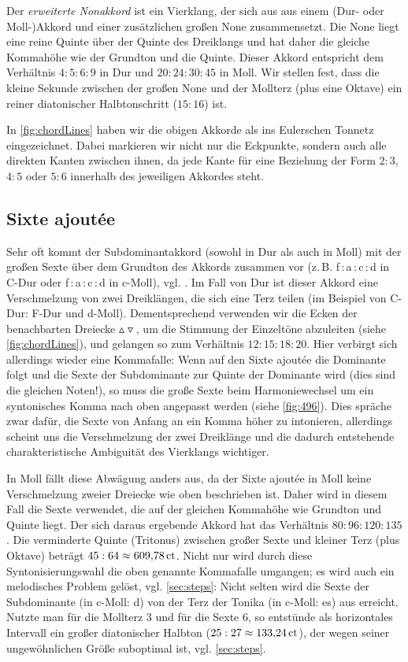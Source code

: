 Der \emph{erweiterte Nonakkord} ist ein Vierklang, der sich aus aus einem (Dur-
oder Moll-)Akkord und einer zusätzlichen großen None zusammensetzt.  Die None
liegt eine reine Quinte über der Quinte des Dreiklangs und hat daher die gleiche
Kommahöhe wie der Grundton und die Quinte. Dieser
Akkord entspricht dem Verhältnis $4:5:6:9$ in Dur und $20:24:30:45$ in Moll. Wir
stellen fest, dass die kleine Sekunde zwischen der großen None und der Mollterz
(plus eine Oktave) ein reiner diatonischer Halbtonschritt ($15:16$) ist.

In \cref{fig:chordLines} haben wir die obigen Akkorde als ins Eulerschen Tonnetz
eingezeichnet. Dabei markieren wir nicht nur die Eckpunkte, sondern auch alle
direkten Kanten zwischen ihnen, da jede Kante für eine Beziehung der Form $2:3$,
$4:5$ oder $5:6$ innerhalb des jeweiligen Akkordes steht.

\subsection{Sixte ajoutée}
\label{sec:sixte}

Sehr oft kommt der Subdominantakkord (sowohl in Dur als auch in Moll) mit der
großen Sexte über dem Grundton des Akkords zusammen vor
(z.\,B. f\,:\,a\,:\,c\,:\,d in C-Dur oder f\,:\,\flat a\,:\,c\,:\,d in c-Moll),
vgl. \cite[{}9.3]{Skript}.  Im Fall von Dur ist dieser Akkord eine Verschmelzung
von zwei Dreiklängen, die sich eine Terz teilen (im Beispiel von C-Dur: F-Dur
und d-Moll). Dementsprechend verwenden wir die Ecken der benachbarten Dreiecke
$\vartriangle\!\!\!\triangledown$, um die Stimmung der Einzeltöne abzuleiten
(siehe \cref{fig:chordLines}), und gelangen so zum Verhältnis
$12:15:18:20$. Hier verbirgt sich allerdings wieder eine Kommafalle: Wenn auf
den Sixte ajoutée die Dominante folgt und die Sexte der Subdominante zur Quinte
der Dominante wird (dies sind die gleichen Noten!), so muss die große Sexte beim
Harmoniewechsel um ein syntonisches Komma nach oben angepasst werden (siehe
\cref{fig:496}).  Dies spräche zwar dafür, die Sexte von Anfang an ein Komma
höher zu intonieren, allerdings scheint uns die Verschmelzung der zwei
Dreiklänge und die dadurch entstehende charakteristische Ambiguität des
Vierklangs wichtiger.

In Moll fällt diese Abwägung anders aus, da der Sixte ajoutée in Moll keine
Verschmelzung zweier Dreiecke wie oben beschrieben ist.  Daher wird in diesem
Fall die Sexte verwendet, die auf der gleichen Kommahöhe wie Grundton und Quinte
liegt. Der sich daraus ergebende Akkord hat das Verhältnis $80:96:120:135$.  Die
verminderte Quinte (Tritonus) zwischen großer Sexte und kleiner Terz (plus
Oktave) beträgt $45:64\approx 609{,}78\,\text{ct}$.  Nicht nur wird durch diese
Syntonisierungswahl die oben genannte Kommafalle umgangen; es wird auch ein
melodisches Problem gelöst, vgl. \cref{sec:steps}: Nicht selten wird die Sexte
der Subdominante (in c-Moll: d) von der Terz der Tonika (in c-Moll: es) aus
erreicht.  Nutzte man für die Mollterz \flatp $3$ und für die Sexte \naturalp
$6$, so entstünde als horizontales Intervall ein großer diatonischer Halbton
($25:27\approx 133{,}24\,\text{ct}$), der wegen seiner ungewöhnlichen Größe suboptimal
ist, vgl. \cref{sec:steps}.

